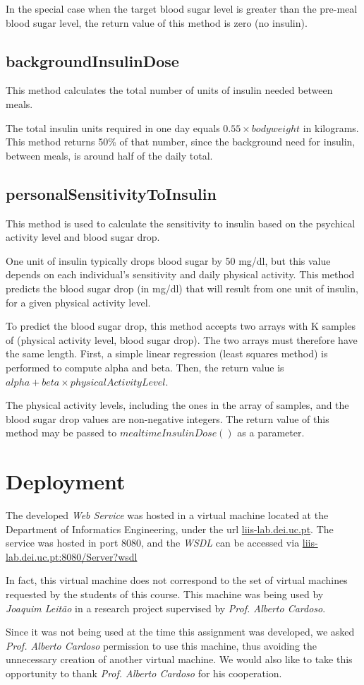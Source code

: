     In the special case when the target blood sugar level is greater than the
pre-meal blood sugar level, the return value of this method is zero (no
insulin).

\subsection{backgroundInsulinDose}

    This method calculates the total number of units of insulin needed between meals.
    
    The total insulin units required in one day equals $0.55 \times body
weight$ in kilograms. This method returns 50\% of that number, since
the background need for insulin, between meals, is around half of the
daily total.

\subsection{personalSensitivityToInsulin}

    This method is used to calculate the sensitivity to insulin based on the psychical activity level and blood sugar drop.
    
    One unit of insulin typically drops blood sugar by 50 mg/dl, but this
value depends on each individual's sensitivity and daily physical
activity. This method predicts the blood sugar drop (in mg/dl) that will
result from one unit of insulin, for a given physical activity level.

    To predict the blood sugar drop, this method accepts two arrays with
K samples of (physical activity level, blood sugar drop). The two arrays
must therefore have the same length. First, a simple linear regression
(least squares method) is performed to compute alpha and beta. Then, the
return value is $alpha + beta \times physicalActivityLevel$.

    The physical activity levels, including the ones in the array of samples,
and the blood sugar drop values are non-negative integers. The return
value of this method may be passed to $mealtimeInsulinDose()$
as a parameter.

\section{Deployment}

    The developed \emph{Web Service} was hosted in a virtual machine located at the Department of Informatics Engineering, under the url \url{liis-lab.dei.uc.pt}. The service was hosted in port $8080$, and the \emph{WSDL} can be accessed via \url{liis-lab.dei.uc.pt:8080/Server?wsdl}
    
    In fact, this virtual machine does not correspond to the set of virtual machines requested by the students of this course. This machine was being used by \emph{Joaquim Leitão} in a research project supervised by \emph{Prof. Alberto Cardoso}.
    
    Since it was not being used at the time this assignment was developed, we asked \emph{Prof. Alberto Cardoso} permission to use this machine, thus avoiding the unnecessary creation of another virtual machine. We would also like to take this opportunity to thank \emph{Prof. Alberto Cardoso} for his cooperation.